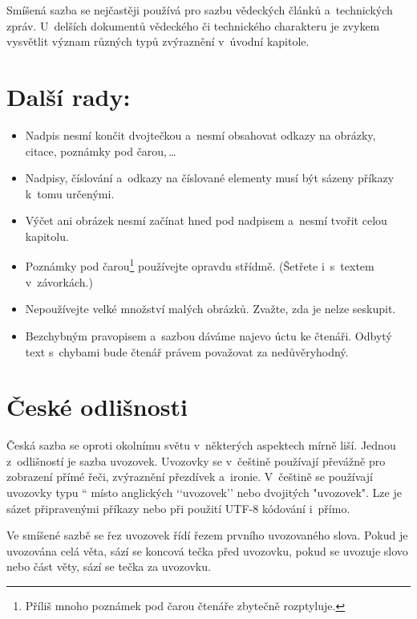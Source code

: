 \documentclass[a4paper, 10pt,twocolumn]{article}
\newcommand{\myuv}[1]{\quotedblbase #1\textquotedblleft}
\begin{document}
Smíšená sazba se nejčastěji používá pro sazbu vědeckých článků a~technických zpráv. U~delších dokumentů vědeckého či technického charakteru je zvykem vysvětlit význam různých typů zvýraznění v~úvodní kapitole.

\section{Další rady:}
\label{sec3}
\begin{itemize}
\item Nadpis nesmí končit dvojtečkou a~nesmí obsahovat odkazy na obrázky, citace, poznámky pod čarou,\,\dots

\item Nadpisy, číslování a~odkazy na číslované elementy musí být sázeny příkazy k~tomu určenými.

\item Výčet ani obrázek nesmí začínat hned pod nadpisem a~nesmí tvořit celou kapitolu.

\item Poznámky pod čarou\footnote{Příliš mnoho poznámek pod čarou čtenáře zbytečně rozptyluje.} používejte opravdu střídmě. (Šetřete i~s~textem v~závorkách.)

\item Nepoužívejte velké množství malých obrázků. Zvažte, zda je nelze seskupit.

\item Bezchybným pravopisem a~sazbou dáváme najevo úctu ke čtenáři. Odbytý text s~chybami bude čtenář právem považovat za nedůvěryhodný.
\end{itemize}

\section{České odlišnosti}

Česká sazba se oproti okolnímu světu v~některých aspektech mírně liší. Jednou z~odlišností je sazba uvozovek. Uvozovky se v~češtině používají převážně pro zobrazení přímé řeči, zvýraznění přezdívek a~ironie. V~češtině se používají uvozovky typu \myuv{9966} místo anglických ‘‘uvozovek’’ nebo dvojitých "uvozovek". Lze je sázet připravenými příkazy nebo při použití UTF-8 kódování i~přímo.

Ve smíšené sazbě se řez uvozovek řídí řezem prvního uvozovaného slova. Pokud je uvozována celá věta, sází se koncová tečka před uvozovku, pokud se uvozuje slovo nebo část věty, sází se tečka za uvozovku.
\end{document}
